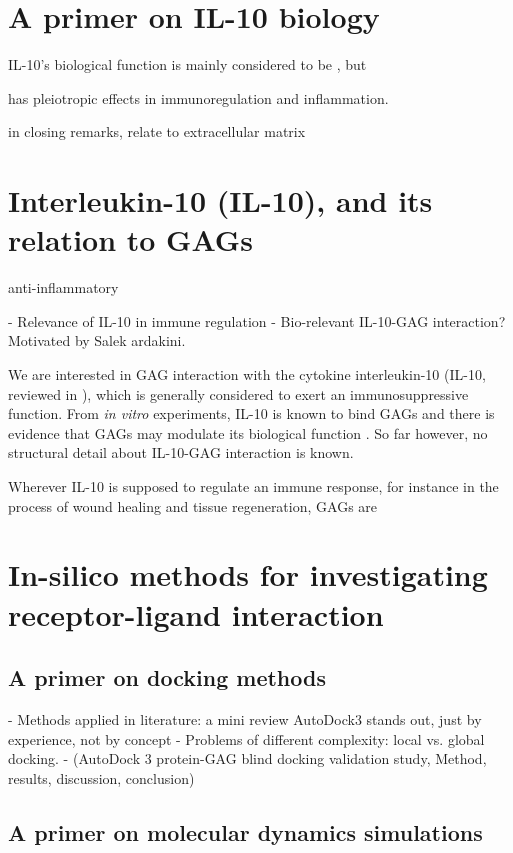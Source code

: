 \section{A primer on IL-10 biology}

 IL-10's biological function is mainly considered to be
, but

 has pleiotropic effects in immunoregulation and
inflammation.


        in closing remarks, relate to extracellular matrix


\section{Interleukin-10 (IL-10), and its relation to GAGs}


 anti-inflammatory

- Relevance of IL-10 in immune regulation
- Bio-relevant IL-10-GAG interaction? Motivated by Salek ardakini.

We are interested in GAG interaction with the cytokine interleukin-10 (IL-10,
reviewed in \cite{moore_2001}), which is generally considered to exert an
immunosuppressive function. From \textit{in vitro} experiments, IL-10 is known
to bind GAGs and there is evidence that GAGs may modulate its biological
function \cite{salek_ardakani_2000}. So far however, no structural detail about
IL-10-GAG interaction is known.


Wherever IL-10 is supposed to
regulate an immune response, for instance in the process of wound healing and
tissue regeneration, GAGs are


\section{In-silico methods for investigating receptor-ligand interaction}

\subsection{A primer on docking methods}


    - Methods applied in literature: a mini review
        AutoDock3 stands out, just by experience, not by concept
    - Problems of different complexity: local vs. global docking.
    - (AutoDock 3 protein-GAG blind docking validation study,
        Method, results, discussion, conclusion)

\lipsum[1-5]

\subsection{A primer on molecular dynamics simulations}

